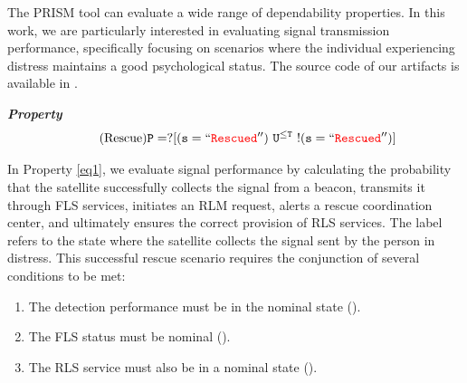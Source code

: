 The PRISM tool can evaluate a wide range of dependability properties. In this work, we are particularly interested in evaluating signal transmission performance, specifically focusing on scenarios where the individual experiencing distress maintains a good psychological status. The source code of our artifacts is available in \cite{newcas2025}.

	    \begin{resp}{\textbf{\textit{Property}}}
        \begin{equation}
        \label{eq1}\tag{Rescue}
         \mathtt{ P=? [ (s=``\textcolor{red}{Rescued} '') \  U^{\leq T} \ !(s=``\textcolor{red}{Rescued} '')  ]} 
        \end{equation}
        \end{resp}
        \normalsize
        
In Property \ref{eq1}, we evaluate signal performance by calculating the probability that the satellite successfully collects the signal from a beacon, transmits it through FLS services, initiates an RLM request, alerts a rescue coordination center, and ultimately ensures the correct provision of RLS services. The label  refers to the state where the satellite collects the signal sent by the person in distress. This successful rescue scenario requires the conjunction of several conditions to be met: 
\begin{enumerate}
\item The detection performance must be in the nominal state ().
\item The FLS status must be nominal ().
\item The RLS service must also be in a nominal state ().
\end{enumerate}

